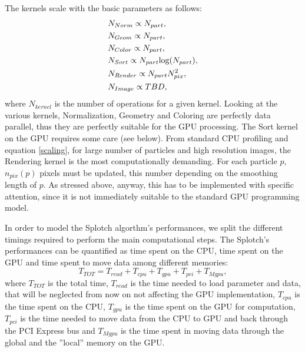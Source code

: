 \documentclass[11pt]{article}
\begin{document}
The kernels scale with the basic parameters as follows:
\begin{align}\label{scaling}
& N_{Norm} \propto N_{part},\\
& N_{Geom} \propto N_{part},\\
& N_{Color} \propto N_{part},\\
& N_{Sort} \propto N_{part}{\rm log}(N_{part}),\\
& N_{Render} \propto N_{part}N_{pix}^2,\\
& N_{Image} \propto TBD,
\end{align}
where $N_{kernel}$ is the number of operations for a given kernel.
Looking at the various kernels, Normalization, Geometry and Coloring are perfectly 
data parallel, thus they are perfectly suitable for the GPU processing. 
The Sort kernel on the GPU requires some care (see below). From standard CPU profiling
and equation \eqref{scaling}, for large number of particles and high resolution images,
the Rendering kernel is the most computationally demanding. For each particle $p$,
$n_{pix}(p)$ pixels must be updated, this number depending on the smoothing length 
of $p$. As stressed above, anyway, this has to be implemented with specific attention,
since it is not immediately suitable to the standard GPU programming model.

In order to model the Splotch algorthm's performances, we split the different timings
required to perform the main computational steps. 
The Splotch's performances can be quantified as time spent on the CPU, time spent on the GPU
and time spent to move data among different memories:
\begin{equation}\label{Ts}
T_{TOT} = T_{read} + T_{cpu} + T_{gpu} + T_{pci} + T_{Mgpu},
\end{equation}
where $T_{TOT}$ is the total time, $T_{read}$ is the time needed to load parameter and data, that 
will be neglected from now on not affecting the GPU implementation, 
$T_{cpu}$ is the time spent on the CPU, $T_{gpu}$ is the time
spent on the GPU for computation, $T_{pci}$ is the time needed to move data from
the CPU to GPU and back through the PCI Express bus and $T_{Mgpu}$ is the time 
spent in moving data through the global and the ''local'' memory on the GPU.
\end{document}
